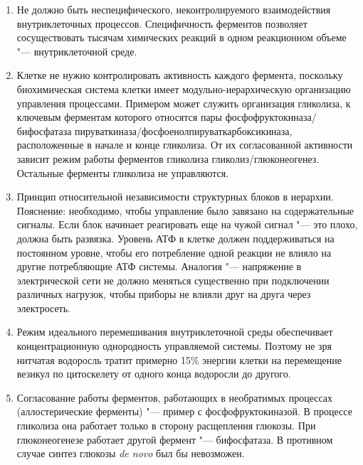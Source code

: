 \documentclass[12pt,a4paper,oneside]{book}
\begin{document}
\begin{enumerate}
\item Не должно быть неспецифического, неконтролируемого взаимодействия внутриклеточных процессов. Специфичность ферментов позволяет сосуществовать тысячам химических реакций в одном реакционном объеме "--- внутриклеточной среде.
 
\item Клетке не нужно контролировать активность каждого фермента, поскольку биохимическая система клетки имеет модульно-иерархическую организацию управления процессами. Примером может служить организация гликолиза, к ключевым ферментам которого относятся пары фосфофруктокиназа/бифосфатаза пируваткиназа/фосфоенолпируваткарбоксикиназа, расположенные в начале и конце гликолиза. От их согласованной активности зависит режим работы ферментов гликолиза гликолиз/глюконеогенез. Остальные ферменты гликолиза не управляются.

\item Принцип относительной независимости структурных блоков в иерархии. Пояснение: необходимо, чтобы управление было завязано на содержательные сигналы. Если блок начинает реагировать еще на чужой сигнал "--- это плохо, должна быть развязка. Уровень АТФ в клетке должен поддерживаться на постоянном уровне, чтобы его потребление одной реакции не влияло на другие потребляющие АТФ системы. Аналогия "--- напряжение в электрической сети не должно меняться существенно при подключении различных нагрузок, чтобы приборы не влияли друг на друга через электросеть.

\item Режим идеального перемешивания внутриклеточной среды обеспечивает концентрационную однородность управляемой системы. Поэтому не зря нитчатая водоросль тратит примерно 15\% энергии клетки на перемещение везикул по цитоскелету от одного конца водоросли до другого.

\item Согласование работы ферментов, работающих в необратимых процессах (аллостерические ферменты) "--- пример с фосфофруктокиназой. В процессе гликолиза она работает только в сторону расщепления глюкозы. При глюконеогенезе работает другой фермент "--- бифосфатаза. В противном случае синтез глюкозы {\it de novo} был бы невозможен.
\end{enumerate}


\end{document}
